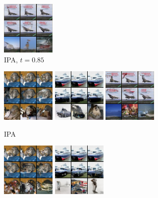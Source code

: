 \begin{figure}[t]
\begin{subfigure}[t]{0.17\textwidth}
      \includegraphics[height=\cifarimgheight]{figs/cigcvae/image-samples/cifar10/freeform_aipo_3_t=0.85_samples}
      \caption{IPA, $t=0.85$}
    \end{subfigure}
    \begin{subfigure}[t]{0.17\textwidth}
      \centering
      \includegraphics[height=\cifarimgheight]{figs/cigcvae/image-samples/cifar10/freeform_aipo_0_samples}
      \includegraphics[height=\cifarimgheight]{figs/cigcvae/image-samples/cifar10/freeform_aipo_1_samples}
      \includegraphics[height=\cifarimgheight]{figs/cigcvae/image-samples/cifar10/freeform_aipo_3_samples}
      \caption{IPA}
    \end{subfigure}
    \begin{subfigure}[t]{0.17\textwidth}
      \centering
      \includegraphics[height=\cifarimgheight]{figs/cigcvae/image-samples/cifar10/freeform_aipo_0_imagenet_samples}
      \includegraphics[height=\cifarimgheight]{figs/cigcvae/image-samples/cifar10/freeform_aipo_1_imagenet_samples}

\end{subfigure}
\end{figure}
